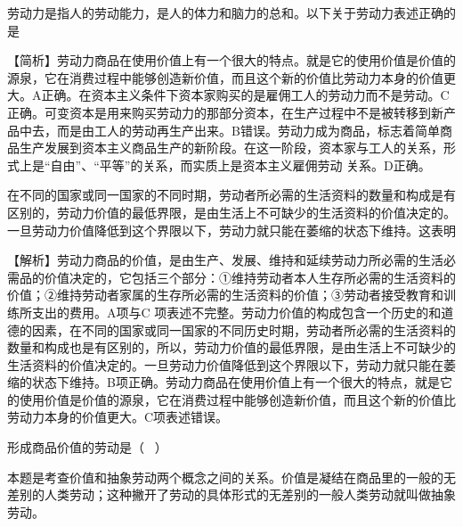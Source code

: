 \question 劳动力是指人的劳动能力，是人的体力和脑力的总和。以下关于劳动力表述正确的是
\par{}
\begin{solution}【简析】劳动力商品在使用价值上有一个很大的特点。就是它的使用价值是价值的源泉，它在消费过程中能够创造新价值，而且这个新的价值比劳动力本身的价值更大。A正确。在资本主义条件下资本家购买的是雇佣工人的劳动力而不是劳动。C正确。可变资本是用来购买劳动力的那部分资本，在生产过程中不是被转移到新产品中去，而是由工人的劳动再生产出来。B错误。劳动力成为商品，标志着简单商品生产发展到资本主义商品生产的新阶段。在这一阶段，资本家与工人的关系，形式上是``自由''、``平等''的关系，而实质上是资本主义雇佣劳动
关系。D正确。
\end{solution}
\question 在不同的国家或同一国家的不同时期，劳动者所必需的生活资料的数量和构成是有区别的，劳动力价值的最低界限，是由生活上不可缺少的生活资料的价值决定的。一旦劳动力价值降低到这个界限以下，劳动力就只能在萎缩的状态下维持。这表明
\par{}
\begin{solution}【解析】劳动力商品的价值，是由生产、发展、维持和延续劳动力所必需的生活必需品的价值决定的，它包括三个部分：①维持劳动者本人生存所必需的生活资料的价值；②维持劳动者家属的生存所必需的生活资料的价值；③劳动者接受教育和训练所支出的费用。A项与C
项表述不完整。劳动力价值的构成包含一个历史的和道德的因素，在不同的国家或同一国家的不同历史时期，劳动者所必需的生活资料的数量和构成也是有区别的，所以，劳动力价值的最低界限，是由生活上不可缺少的生活资料的价值决定的。一旦劳动力价值降低到这个界限以下，劳动力就只能在萎缩的状态下维持。B项正确。劳动力商品在使用价值上有一个很大的特点，就是它的使用价值是价值的源泉，它在消费过程中能够创造新价值，而且这个新的价值比劳动力本身的价值更大。C项表述错误。
\end{solution}
\question 形成商品价值的劳动是（ ~）
\par{}
\begin{solution}本题是考查价值和抽象劳动两个概念之间的关系。价值是凝结在商品里的一般的无差别的人类劳动；这种撇开了劳动的具体形式的无差别的一般人类劳动就叫做抽象劳动。
\end{solution}
